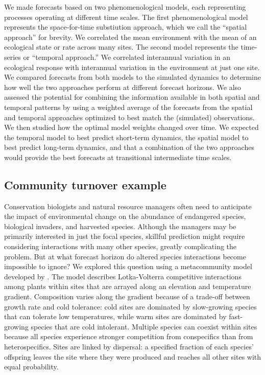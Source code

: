 \documentclass[11pt]{article}
\begin{document}
We made forecasts based on two phenomenological models, each representing processes operating at different time scales. 
The first phenomenological model represents the space-for-time substiution approach, which we call the ``spatial approach'' for brevity. 
We correlated the mean environment with the mean of an ecological state or rate across many sites. The second model represents the time-series or ``temporal approach.'' We correlated interannual variation in an ecological response with interannual variation in the environment at just one site. 
We compared forecasts from both models to the simulated dynamics to determine how well the two approaches perform at different forecast horizons. We also assessed the potential for combining the information available in both spatial and temporal patterns by using a weighted average of the forecasts from the spatial and temporal approaches optimized to best match the (simulated) observations. We then studied how the optimal model weights changed over time. We expected the temporal model to best predict short-term dynamics, the spatial model to best predict long-term dynamics, and that a combination of the two approaches would provide the best forecasts at transitional intermediate time scales.

\subsection*{Community turnover example}

Conservation biologists and natural resource managers often need to anticipate the impact of environmental change on the abundance of 
endangered species, biological invaders, and harvested species. Although the managers may be primarily interested in just the focal species, skillful prediction might require considering interactions with many other species, greatly complicating the problem. But at what forecast horizon do altered species interactions become impossible to ignore? We explored this question using a metacommunity model developed by \cite{alexander_lags_2018}. The model describes Lotka-Volterra competitive interactions among plants within sites that are arrayed along an elevation and temperature gradient. Composition varies along the gradient because of a trade-off between growth rate and cold tolerance: cold sites are dominated by slow-growing species that can tolerate low temperatures, while warm sites are dominated by  fast-growing species that are cold intolerant. Multiple species can coexist within sites because all species experience stronger competition from conspecifics than from heterospecifics. Sites are linked by dispersal: a specified fraction of each species' offspring leaves the site where they were produced and reaches all other sites with equal probability.
\end{document}
